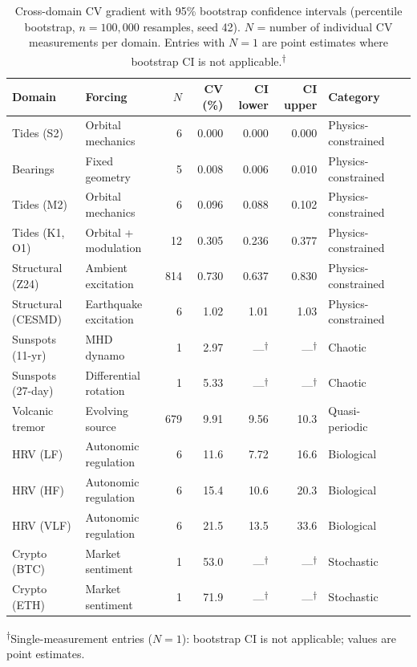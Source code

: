 \begin{table}[htbp]
\centering
\caption{Cross-domain CV gradient with 95\% bootstrap confidence intervals (percentile bootstrap, $n=100{,}000$ resamples, seed 42). $N$ = number of individual CV measurements per domain. Entries with $N=1$ are point estimates where bootstrap CI is not applicable.\textsuperscript{$\dagger$}}
\label{tab:cvgradient}
\smallskip
\small
\begin{tabular}{llrrrrll}
\toprule
\textbf{Domain} & \textbf{Forcing} & \textbf{$N$} & \textbf{CV (\%)} & \textbf{CI lower} & \textbf{CI upper} & \textbf{Category} \\
\midrule
Tides (S2)             & Orbital mechanics        &    6 &  0.000 &  0.000 &  0.000 & Physics-constrained \\
Bearings               & Fixed geometry           &    5 &  0.008 &  0.006 &  0.010 & Physics-constrained \\
Tides (M2)             & Orbital mechanics        &    6 &  0.096 &  0.088 &  0.102 & Physics-constrained \\
Tides (K1, O1)         & Orbital + modulation     &   12 &  0.305 &  0.236 &  0.377 & Physics-constrained \\
Structural (Z24)       & Ambient excitation       &  814 &  0.730 &  0.637 &  0.830 & Physics-constrained \\
Structural (CESMD)     & Earthquake excitation    &    6 &   1.02 &   1.01 &   1.03 & Physics-constrained \\
\midrule
Sunspots (11-yr)       & MHD dynamo               &    1 &   2.97 & ---\textsuperscript{$\dagger$} & ---\textsuperscript{$\dagger$} & Chaotic \\
Sunspots (27-day)      & Differential rotation    &    1 &   5.33 & ---\textsuperscript{$\dagger$} & ---\textsuperscript{$\dagger$} & Chaotic \\
Volcanic tremor        & Evolving source          &  679 &   9.91 &   9.56 &   10.3 & Quasi-periodic \\
HRV (LF)               & Autonomic regulation     &    6 &   11.6 &   7.72 &   16.6 & Biological \\
HRV (HF)               & Autonomic regulation     &    6 &   15.4 &   10.6 &   20.3 & Biological \\
HRV (VLF)              & Autonomic regulation     &    6 &   21.5 &   13.5 &   33.6 & Biological \\
Crypto (BTC)           & Market sentiment         &    1 &   53.0 & ---\textsuperscript{$\dagger$} & ---\textsuperscript{$\dagger$} & Stochastic \\
Crypto (ETH)           & Market sentiment         &    1 &   71.9 & ---\textsuperscript{$\dagger$} & ---\textsuperscript{$\dagger$} & Stochastic \\
\bottomrule
\end{tabular}
\par\smallskip\footnotesize\textsuperscript{$\dagger$}Single-measurement entries ($N=1$): bootstrap CI is not applicable; values are point estimates.
\end{table}